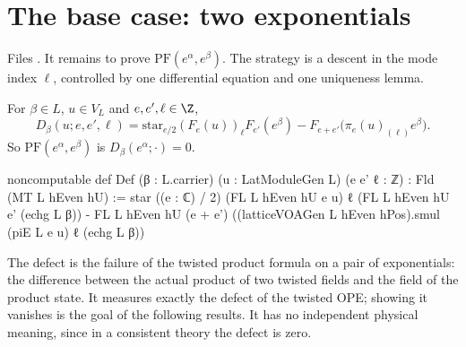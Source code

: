 \section{The base case: two exponentials}\label{ch08:sec:base}

Files .
It remains to prove $\mathrm{PF}(e^\alpha,e^\beta)$.  The strategy is a descent in the mode index
$\ell$, controlled by one differential equation and one uniqueness lemma.

\begin{definition}[Defect]\label{ch08:def:Def}
For $\beta\in L$, $u\in V_L$ and $e,e',\ell\in\Z$,
\begin{equation*}
  D_\beta(u;e,e',\ell)=\mathrm{star}_{e/2}(F_e(u))_\ell F_{e'}(e^\beta)-F_{e+e'}\bigl(\pi_e(u)_{(\ell)}e^\beta\bigr).
\end{equation*}
So $\mathrm{PF}(e^\alpha,e^\beta)$ is $D_\beta(e^\alpha;\cdot)=0$.
\end{definition}
\begin{leancode}
noncomputable def Def (β : L.carrier) (u : LatModuleGen L) (e e' ℓ : ℤ) : Fld (MT L hEven hU) :=
  star ((e : ℂ) / 2) (FL L hEven hU e u) ℓ (FL L hEven hU e' (echg L β))
    - FL L hEven hU (e + e') ((latticeVOAGen L hEven hPos).smul (piE L e u) ℓ (echg L β))
\end{leancode}

\begin{physics}
The defect is the failure of the twisted product formula on a pair of exponentials: the difference between the actual product of two twisted fields and the field of the product state. It measures exactly the defect of the twisted OPE; showing it vanishes is the goal of the following results. It has no independent physical meaning, since in a consistent theory the defect is zero.
\end{physics}

